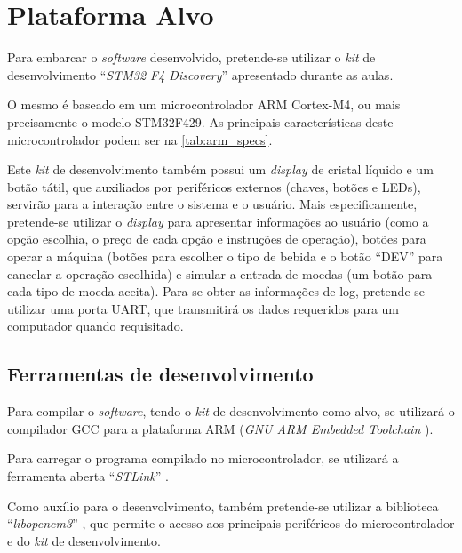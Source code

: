 %
%
%
%
%

%
%
%
%
%

\section{Plataforma Alvo} \label{sec:platform}

Para embarcar o \textit{software} desenvolvido, pretende-se utilizar o \textit{kit} de desenvolvimento ``\textit{STM32 F4 Discovery}'' \cite{stm32_discovery} apresentado durante as aulas.

O mesmo é baseado em um microcontrolador ARM Cortex-M4, ou mais precisamente o modelo STM32F429. As principais características deste microcontrolador podem ser na \autoref{tab:arm_specs}.

Este \textit{kit} de desenvolvimento também possui um \textit{display} de cristal líquido e um botão tátil, que auxiliados por periféricos externos (chaves, botões e LEDs), servirão para a interação entre o sistema e o usuário. Mais especificamente, pretende-se utilizar o \textit{display} para apresentar informações ao usuário (como a opção escolhia, o preço de cada opção e instruções de operação), botões para operar a máquina (botões para escolher o tipo de bebida e o botão ``DEV'' para cancelar a operação escolhida) e simular a entrada de moedas (um botão para cada tipo de moeda aceita). Para se obter as informações de log, pretende-se utilizar uma porta UART, que transmitirá os dados requeridos para um computador quando requisitado.

\subsection{Ferramentas de desenvolvimento}

Para compilar o \textit{software}, tendo o \textit{kit} de desenvolvimento como alvo, se utilizará o compilador GCC para a plataforma ARM (\textit{GNU ARM Embedded Toolchain} \cite{gcc_arm}).

Para carregar o programa compilado no microcontrolador, se utilizará a ferramenta aberta ``\textit{STLink}'' \cite{stlink}.

Como auxílio para o desenvolvimento, também pretende-se utilizar a biblioteca ``\textit{libopencm3}'' \cite{libopencm3}, que permite o acesso aos principais periféricos do microcontrolador e do \textit{kit} de desenvolvimento.
